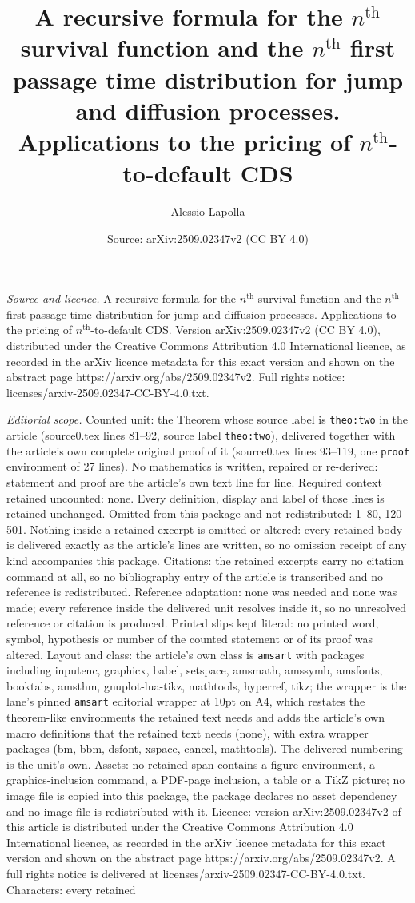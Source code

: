 \documentclass[10pt,a4paper]{amsart}
\title[A recursive formula for the $n^\text{th}$ survival function ]{A recursive formula for the $n^\text{th}$ survival function and the $n^\text{th}$ first passage time distribution for jump and diffusion processes. Applications to the pricing of $n^\text{th}$-to-default CDS}
\author{Alessio Lapolla}
\date{Source: arXiv:2509.02347v2 (CC BY 4.0)}
\begin{document}
\maketitle

\noindent\emph{Source and licence.} A recursive formula for the $n^\text{th}$ survival function and the $n^\text{th}$ first passage time distribution for jump and diffusion processes. Applications to the pricing of $n^\text{th}$-to-default CDS. Version arXiv:2509.02347v2 (CC BY 4.0), distributed under the Creative Commons Attribution 4.0 International licence, as recorded in the arXiv licence metadata for this exact version and shown on the abstract page https://arxiv.org/abs/2509.02347v2. Full rights notice: licenses/arxiv-2509.02347-CC-BY-4.0.txt.\par\smallskip

\noindent\textit{Editorial scope.} Counted unit: the Theorem whose source label is \texttt{theo:two} in the article (source0.tex lines 81--92, source label \texttt{theo:two}), delivered together with the article's own complete original proof of it (source0.tex lines 93--119, one \texttt{proof} environment of 27 lines). No mathematics is written, repaired or re-derived: statement and proof are the article's own text line for line. Required context retained uncounted: none. Every definition, display and label of those lines is retained unchanged. Omitted from this package and not redistributed: 1--80, 120--501. Nothing inside a retained excerpt is omitted or altered: every retained body is delivered exactly as the article's lines are written, so no omission receipt of any kind accompanies this package. Citations: the retained excerpts carry no citation command at all, so no bibliography entry of the article is transcribed and no reference is redistributed. Reference adaptation: none was needed and none was made; every reference inside the delivered unit resolves inside it, so no unresolved reference or citation is produced. Printed slips kept literal: no printed word, symbol, hypothesis or number of the counted statement or of its proof was altered. Layout and class: the article's own class is \texttt{amsart} with packages including inputenc, graphicx, babel, setspace, amsmath, amssymb, amsfonts, booktabs, amsthm, gnuplot-lua-tikz, mathtools, hyperref, tikz; the wrapper is the lane's pinned \texttt{amsart} editorial wrapper at 10pt on A4, which restates the theorem-like environments the retained text needs and adds the article's own macro definitions that the retained text needs (none), with extra wrapper packages (bm, bbm, dsfont, xspace, cancel, mathtools). The delivered numbering is the unit's own. Assets: no retained span contains a figure environment, a graphics-inclusion command, a PDF-page inclusion, a table or a TikZ picture; no image file is copied into this package, the package declares no asset dependency and no image file is redistributed with it. Licence: version arXiv:2509.02347v2 of this article is distributed under the Creative Commons Attribution 4.0 International licence, as recorded in the arXiv licence metadata for this exact version and shown on the abstract page https://arxiv.org/abs/2509.02347v2. A full rights notice is delivered at licenses/arxiv-2509.02347-CC-BY-4.0.txt. Characters: every retained 
\end{document}
